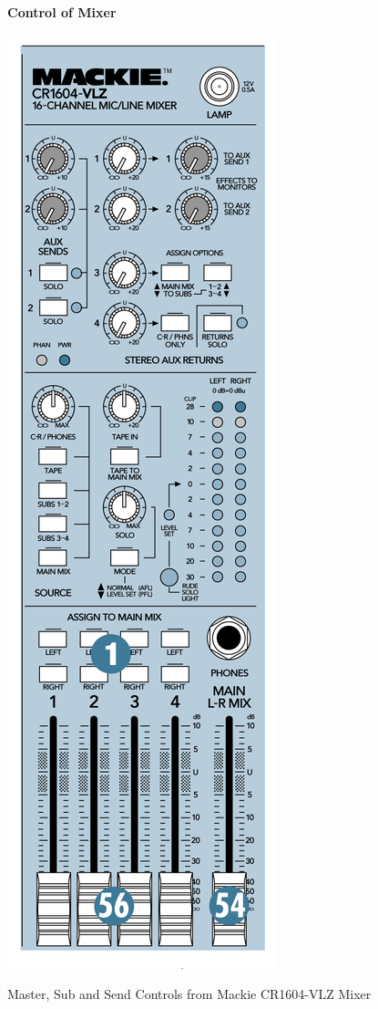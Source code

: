 \documentclass{tufte-book} %
\begin{document}


\newpage

\begin{fullwidth}
\textbf{Control of Mixer}
\end{fullwidth}

\begin{marginfigure}
\includegraphics[width=\linewidth]{Mackie_2.png}
\caption{Master, Sub and Send Controls from Mackie CR1604-VLZ Mixer}
\label{fig:marginfig}
\end{marginfigure}
\end{document}
